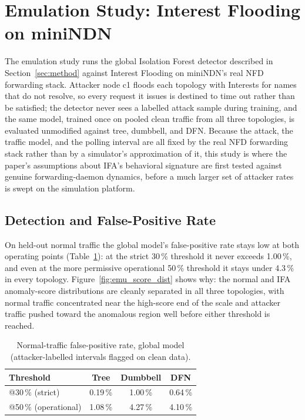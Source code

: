 \section{Emulation Study: Interest Flooding on miniNDN}
\label{sec:emulation}

The emulation study runs the global Isolation Forest detector described in Section~\ref{sec:method} against Interest Flooding on miniNDN's real NFD forwarding stack. Attacker node c1 floods each topology with Interests for names that do not resolve, so every request it issues is destined to time out rather than be satisfied; the detector never sees a labelled attack sample during training, and the same model, trained once on pooled clean traffic from all three topologies, is evaluated unmodified against tree, dumbbell, and DFN. Because the attack, the traffic model, and the polling interval are all fixed by the real NFD forwarding stack rather than by a simulator's approximation of it, this study is where the paper's assumptions about IFA's behavioral signature are first tested against genuine forwarding-daemon dynamics, before a much larger set of attacker rates is swept on the simulation platform.

\subsection{Detection and False-Positive Rate}

On held-out normal traffic the global model's false-positive rate stays low at both operating points (Table~\ref{tab:emu-fpr}): at the strict 30\,\% threshold it never exceeds 1.00\,\%, and even at the more permissive operational 50\,\% threshold it stays under 4.3\,\% in every topology. Figure~\ref{fig:emu_score_dist} shows why: the normal and IFA anomaly-score distributions are cleanly separated in all three topologies, with normal traffic concentrated near the high-score end of the scale and attacker traffic pushed toward the anomalous region well before either threshold is reached.

\begin{table}[t]
\centering
\caption{Normal-traffic false-positive rate, global model (attacker-labelled intervals flagged on clean data).}
\label{tab:emu-fpr}
\begin{tabular}{@{}lccc@{}}
\toprule
\textbf{Threshold} & \textbf{Tree} & \textbf{Dumbbell} & \textbf{DFN} \\
\midrule
@30\,\% (strict)       & 0.19\,\% & 1.00\,\% & 0.64\,\% \\
@50\,\% (operational)  & 1.08\,\% & 4.27\,\% & 4.10\,\% \\
\bottomrule
\end{tabular}
\end{table}

